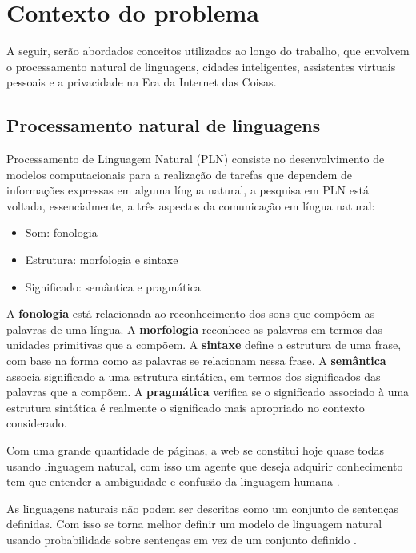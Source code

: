 \chapter{Contexto do problema} \label{c:contexto_do_problema}

A seguir, serão abordados conceitos utilizados ao longo do trabalho, que envolvem o processamento natural de linguagens, cidades inteligentes, assistentes virtuais pessoais e a  privacidade na Era da Internet das Coisas.

\section{Processamento natural de linguagens} \label{s:processamento_natural_de_linguagens}

Processamento de Linguagem Natural (PLN) consiste no desenvolvimento de modelos computacionais para a realização de tarefas que dependem de informações expressas em alguma língua natural, a pesquisa em PLN está voltada, essencialmente, a três aspectos da comunicação em língua natural:
\begin{itemize}
\item  Som: fonologia
\item  Estrutura: morfologia e sintaxe
\item  Significado: semântica e pragmática
\end{itemize}
A \textbf{fonologia} está relacionada ao reconhecimento dos sons que compõem as palavras de uma língua. A \textbf{morfologia} reconhece as palavras em termos das unidades primitivas que a compõem. A \textbf{sintaxe} define a estrutura de uma frase, com base na forma como as palavras se relacionam nessa frase.  A \textbf{semântica} associa significado a uma estrutura sintática, em termos dos significados das palavras que a compõem. A \textbf{pragmática} verifica se o significado associado à uma estrutura sintática é realmente o significado mais apropriado no contexto considerado.

Com uma grande quantidade de páginas, a web se constitui hoje quase todas usando linguagem natural, com isso um agente que deseja adquirir conhecimento tem que entender a ambiguidade e confusão da linguagem humana \cite{inteligencia-artificial}.

As linguagens naturais não podem ser descritas como um conjunto de sentenças definidas. Com isso se torna melhor definir um modelo de linguagem natural usando probabilidade sobre sentenças em vez de um conjunto definido \cite{inteligencia-artificial}.

